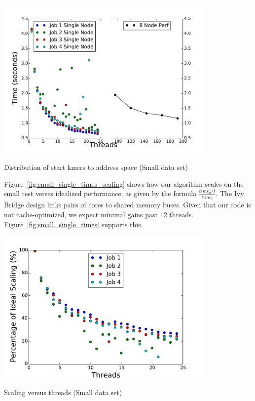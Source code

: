 \documentclass{article}
\begin{document}
\begin{minipage}{\linewidth}
  \captionsetup{type=figure}
  \begin{center}
  \includegraphics[width=0.8\textwidth]{CombineTimes.pdf}
  \end{center}
  \caption{Distribution of start kmers to address space (Small data set)} \label{fig:small_mult_times}
\end{minipage}

Figure~\ref{fig:small_single_times_scaling} shows how our algorithm scales on the small test verses idealized performance, as given by the formula $\frac{time_0/t}{time_t}$. The Ivy Bridge design links pairs of cores to shared memory buses. Given that our code is not cache-optimized, we expect minimal gains past 12 threads. Figure~\ref{fig:small_single_times} supports this.

\begin{minipage}{\linewidth}
  \captionsetup{type=figure}
  \begin{center}
  \includegraphics[width=0.8\textwidth]{SingleScaling.pdf}
  \end{center}
  \caption{Scaling versus threads (Small data set)} \label{fig:small_single_times_scaling}
\end{minipage}
\end{document}
